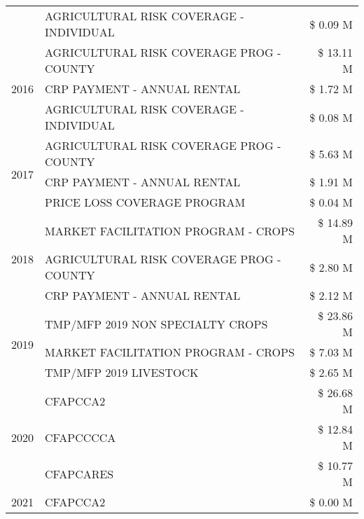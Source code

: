 \begin{tabular}{llr}
 & AGRICULTURAL RISK COVERAGE - INDIVIDUAL & \$ 0.09 M \\
\cline{1-3}
\multirow[t]{3}{*}{2016} & AGRICULTURAL RISK COVERAGE PROG - COUNTY & \$ 13.11 M \\
 & CRP PAYMENT - ANNUAL RENTAL & \$ 1.72 M \\
 & AGRICULTURAL RISK COVERAGE - INDIVIDUAL & \$ 0.08 M \\
\cline{1-3}
\multirow[t]{3}{*}{2017} & AGRICULTURAL RISK COVERAGE PROG - COUNTY & \$ 5.63 M \\
 & CRP PAYMENT - ANNUAL RENTAL & \$ 1.91 M \\
 & PRICE LOSS COVERAGE PROGRAM & \$ 0.04 M \\
\cline{1-3}
\multirow[t]{3}{*}{2018} & MARKET FACILITATION PROGRAM - CROPS & \$ 14.89 M \\
 & AGRICULTURAL RISK COVERAGE PROG - COUNTY & \$ 2.80 M \\
 & CRP PAYMENT - ANNUAL RENTAL & \$ 2.12 M \\
\cline{1-3}
\multirow[t]{3}{*}{2019} & TMP/MFP 2019 NON SPECIALTY CROPS & \$ 23.86 M \\
 & MARKET FACILITATION PROGRAM - CROPS & \$ 7.03 M \\
 & TMP/MFP 2019 LIVESTOCK & \$ 2.65 M \\
\cline{1-3}
\multirow[t]{3}{*}{2020} & CFAPCCA2 & \$ 26.68 M \\
 & CFAPCCCCA & \$ 12.84 M \\
 & CFAPCARES & \$ 10.77 M \\
\cline{1-3}
2021 & CFAPCCA2 & \$ 0.00 M \\
\cline{1-3}
\bottomrule
\end{tabular}
